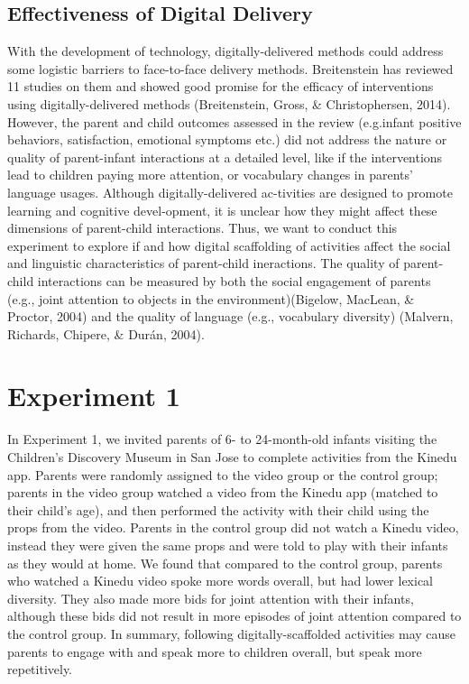 \documentclass[10pt, letterpaper]{article}
\begin{document}
\subsection{Effectiveness of Digital
Delivery}\label{effectiveness-of-digital-delivery}

With the development of technology, digitally-delivered methods could
address some logistic barriers to face-to-face delivery methods.
Breitenstein has reviewed 11 studies on them and showed good promise for
the efficacy of interventions using digitally-delivered methods
(Breitenstein, Gross, \& Christophersen, 2014). However, the parent and
child outcomes assessed in the review (e.g.infant positive behaviors,
satisfaction, emotional symptoms etc.) did not address the nature or
quality of parent-infant interactions at a detailed level, like if the
interventions lead to children paying more attention, or vocabulary
changes in parents' language usages. Although digitally-delivered
ac-tivities are designed to promote learning and cognitive devel-opment,
it is unclear how they might affect these dimensions of parent-child
interactions. Thus, we want to conduct this experiment to explore if and
how digital scaffolding of activities affect the social and linguistic
characteristics of parent-child ineractions. The quality of parent-child
interactions can be measured by both the social engagement of parents
(e.g., joint attention to objects in the environment)(Bigelow, MacLean,
\& Proctor, 2004) and the quality of language (e.g., vocabulary
diversity) (Malvern, Richards, Chipere, \& Durán, 2004).

\section{Experiment 1}\label{experiment-1}

In Experiment 1, we invited parents of 6- to 24-month-old infants
visiting the Children's Discovery Museum in San Jose to complete
activities from the Kinedu app. Parents were randomly assigned to the
video group or the control group; parents in the video group watched a
video from the Kinedu app (matched to their child's age), and then
performed the activity with their child using the props from the video.
Parents in the control group did not watch a Kinedu video, instead they
were given the same props and were told to play with their infants as
they would at home. We found that compared to the control group, parents
who watched a Kinedu video spoke more words overall, but had lower
lexical diversity. They also made more bids for joint attention with
their infants, although these bids did not result in more episodes of
joint attention compared to the control group. In summary, following
digitally-scaffolded activities may cause parents to engage with and
speak more to children overall, but speak more repetitively.
\end{document}
